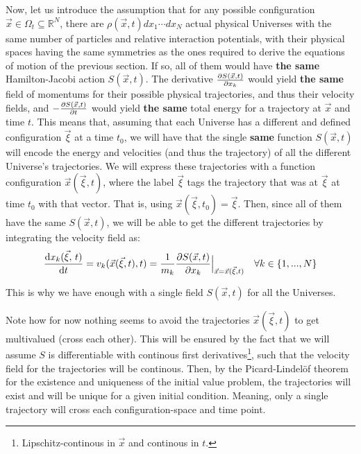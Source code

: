 \documentclass[11pt, a4paper]{article} %
\newcommand{\R}{\mathbb{R}} %
\begin{document}
Now, let us introduce the assumption that for any possible configuration $\vec{x}\in\Omega_t\subseteq\R^N$, there are $\rho(\vec{x},t)dx_1\cdots dx_N$ actual physical Universes with the same number of particles and relative interaction potentials, with their physical spaces having the same symmetries as the ones required to derive the equations of motion of the previous section. If so, all of them would have {\bf the same} Hamilton-Jacobi action $S(\vec{x},t)$. The derivative $\pdv{S(\vec{x},t)}{x_k}$ would yield {\bf the same} field of momentums for their possible physical trajectories, and thus their velocity fields, and $-\pdv{S(\vec{x},t)}{t}$ would yield {\bf the same} total energy for a trajectory at $\vec{x}$ and time $t$. This means that, assuming that each Universe has a different and defined configuration $\vec{\xi}$ at a time $t_0$, we will have that the single {\bf same} function $S(\vec{x},t)$ will encode the energy and velocities (and thus the trajectory) of all the different Universe's trajectories. We will express these trajectories with a function configuration $\vec{x}(\vec{\xi},t)$, where the label $\vec{\xi}$ tags the trajectory that was at $\vec{\xi}$ at time $t_0$ with that vector. That is, using $\vec{x}(\vec{\xi},t_0)=\vec{\xi}$. Then, since all of them have the same $S(\vec{x},t)$, we will be able to get the different trajectories by integrating the velocity field as:
\begin{equation}
\dv{x_k(\vec{\xi},\,t )}{t} = v_k(\vec{x}(\vec{\xi},t),t)= \frac{1}{m_k} \pdv{S(\vec{x},t)}{x_k}\Big\rvert_{\vec{x}=\vec{x}( \vec{\xi},t)}\quad \forall k\in\{1,...,N\}
\end{equation}

This is why we have enough with a single field $S(\vec{x},t)$ for all the Universes.

Note how for now nothing seems to avoid the trajectories $\vec	{x}(\vec{\xi},t)$ to get multivalued (cross each other). This will be ensured by the fact that we will assume $S$ is differentiable with continous first derivatives\footnote{Lipschitz-continous in $\vec{x}$ and continous in $t$.}, such that the velocity field for the trajectories will be continous. Then, by the Picard-Lindelöf theorem for the existence and uniqueness of the initial value problem, the trajectories will exist and will be unique for a given initial condition. Meaning, only a single trajectory will cross each configuration-space and time point. 
\end{document}
